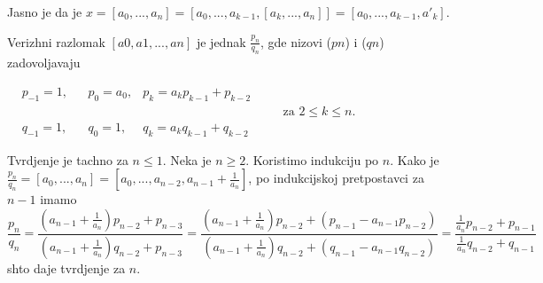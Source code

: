 \documentclass[11pt]{article}
\begin{document}
Jasno je da je $x =[a_0,...,a_n]=[a_0,..., a_{k-1},[a_k,...,a_n]]=[a_0,...,a_{k-1},a'_k]$.
\begin{te}
Verizhni razlomak $[a0, a1, . . . , an]$ je jednak $\frac{p_n}{q_n}$, gde nizovi ($pn$) i ($qn$) zadovoljavaju 
\begin{center}
$\begin{aligned}
    &p_{-1}=1,& &p_0=a_0, &p_k=a_kp_{k-1}+p_{k-2}&\\[-3mm]
    &&&&&&\quad\text{za } 2\leq k\leq n.\\[-3mm]
    &q_{-1}=1,& &q_0=1, &q_k=a_kq_{k-1}+q_{k-2}&
\end{aligned}$
\end{center}
\end{te}

\begin{dok}
Tvrdjenje je tachno za $n \leq 1$. Neka je $n \geq 2$. Koristimo indukciju po $n$. Kako je \\$\frac{p_n}{q_n}=[a_0,...,a_n]= [a_0,...,a_{n-2},a_{n-1}+\frac{1}{a_n}]$, po indukcijskoj pretpostavci za $n-1$ imamo $$\frac{p_n}{q_n}=\frac{(a_{n-1}+\frac{1}{a_n})p_{n-2}+p_{n-3}}{(a_{n-1}+\frac{1}{a_n})q_{n-2}+p_{n-3}}=\frac{(a_{n-1}+\frac{1}{a_n})p_{n-2}+(p_{n-1}-a_{n-1}p_{n-2})}{(a_{n-1}+\frac{1}{a_n})q_{n-2}+(q_{n-1}-a_{n-1}q_{n-2})}=\frac{\frac{1}{a_n}p_{n-2}+p_{n-1}}{\frac{1}{a_n}q_{n-2}+q_{n-1}}$$
shto daje tvrdjenje za $n$.
\end{dok}
\end{document}
